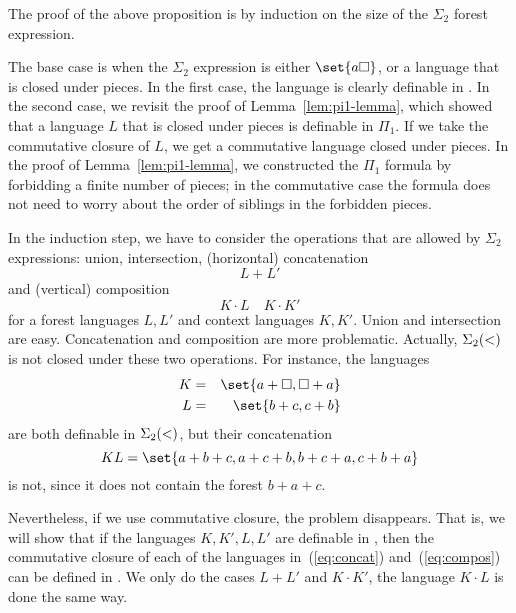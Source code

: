 \documentclass{LMCS}
\begin{document}
The proof of the above proposition is by induction on the size of the
$\Sigma_2$ forest expression. 

The base case is when the  $\Sigma_2$ expression is either $\set{a
  \hole}$, or a language that is closed under pieces. In the first
case, the language is clearly definable in \Stwo. In the second case,
we revisit the proof of Lemma~\ref{lem:pi1-lemma}, which showed that a
language $L$ that is closed under pieces is definable in $\Pi_1$. If
we take the commutative closure of $L$, we get a commutative language closed
under pieces. In the proof of Lemma~\ref{lem:pi1-lemma}, we
constructed the $\Pi_1$ formula by  forbidding a finite number of
pieces; in the commutative case the formula does not need to worry
about the order of siblings in the forbidden pieces.

In the induction step, we have to consider the operations that are
allowed by $\Sigma_2$ expressions: union, intersection, (horizontal)
concatenation
\begin{equation}
  \label{eq:concat}
    L+L'
\end{equation}
and (vertical) composition
\begin{equation}
  \label{eq:compos}
    K \cdot L \quad K \cdot K'
\end{equation}
for a forest languages $L,L'$ and context languages $K,K'$. Union and intersection are easy. Concatenation and composition are more problematic. Actually, 
$\Sigma_2(<)$ is not closed under these two operations. For instance, the
languages
\begin{eqnarray*}
  K &= & \set{a+\hole, \hole + a}\\
L &=& \set{b+c,c+b}
\end{eqnarray*}
are both definable in $\Sigma_2(<)$, but their concatenation
\[
  KL=\set{a+b+c,a+c+b,b+c+a,c+b+a}
\]
is not, since it does not contain the forest $b+a+c$. 

Nevertheless, if we use commutative closure, the problem disappears. That
is, we will show that if the languages $K,K',L,L'$ are definable in
\Stwo, then the commutative closure of each of the languages
in~(\ref{eq:concat}) and~(\ref{eq:compos}) can be defined in \Stwo.
We only do the cases $L+L'$ and $K \cdot K'$, the language $K \cdot L$ is 
done the same way.
\end{document}
